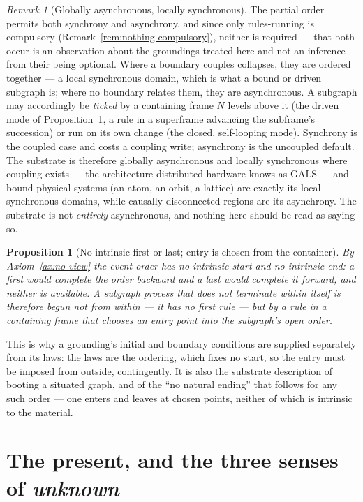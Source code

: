 \documentclass[11pt,a4paper]{article}
\newtheorem{proposition}[definition]{Proposition}
\theoremstyle{remark}\newtheorem{remark}[definition]{Remark}
\begin{document}
\begin{remark}[Globally asynchronous, locally synchronous]\label{rem:gals}
The partial order permits both synchrony and asynchrony, and since only rules-running is compulsory (Remark~\ref{rem:nothing-compulsory}), neither is required --- that both occur is an observation about the groundings treated here and not an inference from their being optional. Where a boundary couples collapses, they are ordered together --- a local synchronous domain, which is what a bound or driven subgraph is; where no boundary relates them, they are asynchronous. A subgraph may accordingly be \emph{ticked} by a containing frame $N$ levels above it (the driven mode of Proposition~\ref{prop:no-start-end}, a rule in a superframe advancing the subframe's succession) or run on its own change (the closed, self-looping mode). Synchrony is the coupled case and costs a coupling write; asynchrony is the uncoupled default. The substrate is therefore globally asynchronous and locally synchronous where coupling exists --- the architecture distributed hardware knows as GALS \citep{chapiro1984} --- and bound physical systems (an atom, an orbit, a lattice) are exactly its local synchronous domains, while causally disconnected regions are its asynchrony. The substrate is not \emph{entirely} asynchronous, and nothing here should be read as saying so.
\end{remark}

\begin{proposition}[No intrinsic first or last; entry is chosen from the container]\label{prop:no-start-end}
By Axiom~\ref{ax:no-view} the event order has no intrinsic start and no intrinsic end: a first would complete the order backward and a last would complete it forward, and neither is available. A subgraph process that does not terminate within itself is therefore begun not from within --- it has no first rule --- but by a rule in a containing frame that chooses an entry point into the subgraph's open order.
\end{proposition}
This is why a grounding's initial and boundary conditions are supplied separately from its laws: the laws are the ordering, which fixes no start, so the entry must be imposed from outside, contingently. It is also the substrate description of booting a situated graph, and of the ``no natural ending'' that follows for any such order --- one enters and leaves at chosen points, neither of which is intrinsic to the material.

\section{The present, and the three senses of \emph{unknown}}\label{sec:present}
\end{document}
